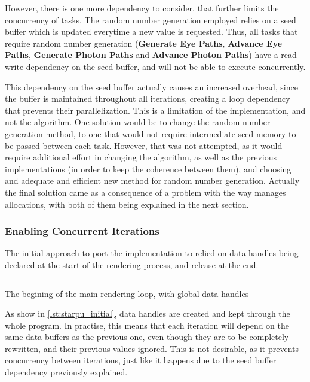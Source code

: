 \documentclass[main.tex]{subfiles}
\begin{document}

However, there is one more dependency to consider, that further limits the concurrency of tasks. The random number generation employed relies on a seed buffer which is updated everytime a new value is requested. Thus, all tasks that require random number generation (\textbf{Generate Eye Paths}, \textbf{Advance Eye Paths}, \textbf{Generate Photon Paths} and \textbf{Advance Photon Paths}) have a read-write dependency on the seed buffer, and will not be able to execute concurrently.

This dependency on the seed buffer actually causes an increased overhead, since the buffer is maintained throughout all iterations, creating a loop dependency that prevents their parallelization. This is a limitation of the implementation, and not the algorithm. One solution would be to change the random number generation method, to one that would not require intermediate seed memory to be passed between each task. However, that was not attempted, as it would require additional effort in changing the algorithm, as well as the previous implementations (in order to keep the coherence between them), and choosing and adequate and efficient new method for random number generation. Actually the final solution came as a consequence of a problem with the way \starpu manages allocations, with both of them being explained in the next section.

\subsubsection{Enabling Concurrent Iterations} \label{section:starpu_concurrent_iters}

The initial approach to port the implementation to \starpu relied on data handles being declared at the start of the rendering process, and release at the end.

\begin{listing}[htp]
  \inputminted[linenos,tabsize=4]{c++}{code/starpu_initial.cpp}

  \caption{The begining of the main rendering loop, with global data handles}
  \label{lst:starpu_initial}
\end{listing}

As show in \cref{lst:starpu_initial}, data handles are created and kept through the whole program. In practise, this means that each iteration will depend on the same data buffers as the previous one, even though they are to be completely rewritten, and their previous values ignored. This is not desirable, as it prevents concurrency between iterations, just like it happens due to the seed buffer dependency previously explained.
\end{document}
